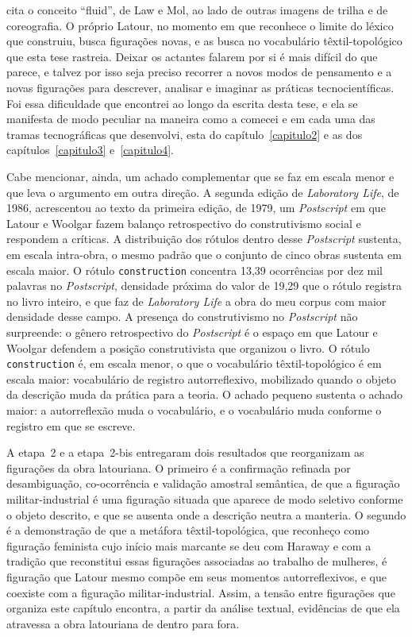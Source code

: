 cita o conceito \enquote{fluid}, de Law e Mol, ao lado de outras imagens de trilha e de coreografia. O próprio Latour, no momento em que reconhece o limite do léxico que construiu, busca figurações novas, e as busca no vocabulário têxtil-topológico que esta tese rastreia. Deixar os actantes falarem por si é mais difícil do que parece, e talvez por isso seja preciso recorrer a novos modos de pensamento e a novas figurações para descrever, analisar e imaginar as práticas tecnocientíficas. Foi essa dificuldade que encontrei ao longo da escrita desta tese, e ela se manifesta de modo peculiar na maneira como a comecei e em cada uma das tramas tecnográficas que desenvolvi, esta do capítulo~\ref{capitulo2} e as dos capítulos~\ref{capitulo3} e~\ref{capitulo4}.

Cabe mencionar, ainda, um achado complementar que se faz em escala menor e que leva o argumento em outra direção. A segunda edição de \emph{Laboratory Life}, de 1986, acrescentou ao texto da primeira edição, de 1979, um \emph{Postscript} em que Latour e Woolgar fazem balanço retrospectivo do construtivismo social e respondem a críticas. A distribuição dos rótulos dentro desse \emph{Postscript} sustenta, em escala intra-obra, o mesmo padrão que o conjunto de cinco obras sustenta em escala maior. O rótulo \texttt{construction} concentra 13,39 ocorrências por dez mil palavras no \emph{Postscript}, densidade próxima do valor de 19,29 que o rótulo registra no livro inteiro, e que faz de \emph{Laboratory Life} a obra do meu corpus com maior densidade desse campo. A presença do construtivismo no \emph{Postscript} não surpreende: o gênero retrospectivo do \emph{Postscript} é o espaço em que Latour e Woolgar defendem a posição construtivista que organizou o livro. O rótulo \texttt{construction} é, em escala menor, o que o vocabulário têxtil-topológico é em escala maior: vocabulário de registro autorreflexivo, mobilizado quando o objeto da descrição muda da prática para a teoria. O achado pequeno sustenta o achado maior: a autorreflexão muda o vocabulário, e o vocabulário muda conforme o registro em que se escreve.

A etapa~2 e a etapa~2-bis entregaram dois resultados que reorganizam as figurações da obra latouriana. O primeiro é a confirmação refinada por desambiguação, co-ocorrência e validação amostral semântica, de que a figuração militar-industrial é uma figuração situada que aparece de modo seletivo conforme o objeto descrito, e que se ausenta onde a descrição neutra a manteria. O segundo é a demonstração de que a metáfora têxtil-topológica, que reconheço como figuração feminista cujo início mais marcante se deu com Haraway e com a tradição que reconstitui essas figurações associadas ao trabalho de mulheres, é figuração que Latour mesmo compõe em seus momentos autorreflexivos, e que coexiste com a figuração militar-industrial. Assim, a tensão entre figurações que organiza este capítulo encontra, a partir da análise textual, evidências de que ela atravessa a obra latouriana de dentro para fora.

